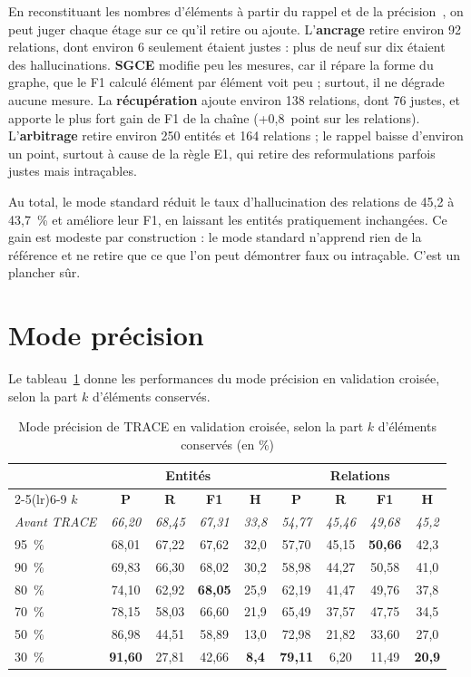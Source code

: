 En reconstituant les nombres d'éléments à partir du rappel et de la précision~\cite{sokolova2009}, on peut juger chaque étage sur ce qu'il retire ou ajoute. L'\textbf{ancrage} retire environ 92 relations, dont environ 6 seulement étaient justes : plus de neuf sur dix étaient des hallucinations. \textbf{SGCE} modifie peu les mesures, car il répare la forme du graphe, que le F1 calculé élément par élément voit peu ; surtout, il ne dégrade aucune mesure. La \textbf{récupération} ajoute environ 138 relations, dont 76 justes, et apporte le plus fort gain de F1 de la chaîne (+0,8~point sur les relations). L'\textbf{arbitrage} retire environ 250 entités et 164 relations ; le rappel baisse d'environ un point, surtout à cause de la règle E1, qui retire des reformulations parfois justes mais intraçables.

Au total, le mode standard réduit le taux d'hallucination des relations de 45,2 à 43,7~\% et améliore leur F1, en laissant les entités pratiquement inchangées. Ce gain est modeste par construction : le mode standard n'apprend rien de la référence et ne retire que ce que l'on peut démontrer faux ou intraçable. C'est un plancher sûr.

\section{Mode précision}\label{sec:c6-precision}

Le tableau~\ref{tab:c6-precision} donne les performances du mode précision en validation croisée, selon la part $k$ d'éléments conservés.

\begin{table}[H]
\centering
\caption{Mode précision de TRACE en validation croisée, selon la part $k$ d'éléments conservés (en \%)}\label{tab:c6-precision}
\small
\begin{tabular}{lcccccccc}
\toprule
& \multicolumn{4}{c}{\textbf{Entités}} & \multicolumn{4}{c}{\textbf{Relations}} \\
\cmidrule(lr){2-5}\cmidrule(lr){6-9}
\textbf{$k$} & \textbf{P} & \textbf{R} & \textbf{F1} & \textbf{H} & \textbf{P} & \textbf{R} & \textbf{F1} & \textbf{H} \\
\midrule
\emph{Avant TRACE} & \emph{66,20} & \emph{68,45} & \emph{67,31} & \emph{33,8} & \emph{54,77} & \emph{45,46} & \emph{49,68} & \emph{45,2} \\
95~\% & 68,01 & 67,22 & 67,62 & 32,0 & 57,70 & 45,15 & \textbf{50,66} & 42,3 \\
90~\% & 69,83 & 66,30 & 68,02 & 30,2 & 58,98 & 44,27 & 50,58 & 41,0 \\
80~\% & 74,10 & 62,92 & \textbf{68,05} & 25,9 & 62,19 & 41,47 & 49,76 & 37,8 \\
70~\% & 78,15 & 58,03 & 66,60 & 21,9 & 65,49 & 37,57 & 47,75 & 34,5 \\
50~\% & 86,98 & 44,51 & 58,89 & 13,0 & 72,98 & 21,82 & 33,60 & 27,0 \\
30~\% & \textbf{91,60} & 27,81 & 42,66 & \textbf{8,4} & \textbf{79,11} & 6,20 & 11,49 & \textbf{20,9} \\
\bottomrule
\end{tabular}
\end{table}

